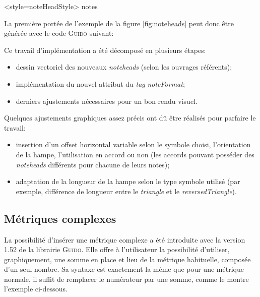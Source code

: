 \documentclass{article}
\newenvironment{gmncode}	{\vspace{-2mm}\small\verbatim}{\endverbatim\vspace{-2mm}}
\newcommand{\guido}			{\textsc{Guido}}
\begin{document}
\begin{gmncode}
\noteFormat<style=noteHeadStyle> notes
\end{gmncode}

La première portée de l'exemple de la figure \ref{fig:noteheads} peut donc être générée avec le code \textsc{Guido} suivant:

\begin{gmncode}
[
  \noteFormat<style="x"> a
  \noteFormat<style="diamond"> a
  \noteFormat<style="round"> a
  \noteFormat<style="square"> a
  \noteFormat<style="triangle"> a
  \noteFormat<style="reversedTriangle"> a
]
\end{gmncode}
\bigskip

Ce travail d'implémentation a été décomposé en plusieurs étapes:
\begin{itemize}
    \item dessin vectoriel des nouveaux \emph{noteheads} (selon les ouvrages référents);
    \item implémentation du nouvel attribut du \emph{tag} \emph{noteFormat};
    \item derniers ajustements nécessaires pour un bon rendu visuel.
\end{itemize}

Quelques ajustements graphiques assez précis ont dû être réalisés pour parfaire le travail:
\begin{itemize}
    \item insertion d'un offset horizontal variable selon le symbole choisi, l'orientation de la hampe, l'utilisation en accord ou non (les accords pouvant posséder des \emph{noteheads} différents pour chacune de leurs notes);
    \item adaptation de la longueur de la hampe selon le type symbole utilisé (par exemple, différence de longueur entre le \emph{triangle} et le \emph{reversedTriangle}).
\end{itemize}


\subsection{Métriques complexes}\label{subsec:metriques}

La possibilité d'insérer une métrique complexe a été introduite avec la version 1.52 de la librairie \guido. Elle offre à l'utilisateur la possibilité d'utiliser, graphiquement, une somme en place et lieu de la métrique habituelle, composée d'un seul nombre. Sa syntaxe est exactement la même que pour une métrique normale, il suffit de remplacer le numérateur par une somme, comme le montre l'exemple ci-dessous.
\end{document}
